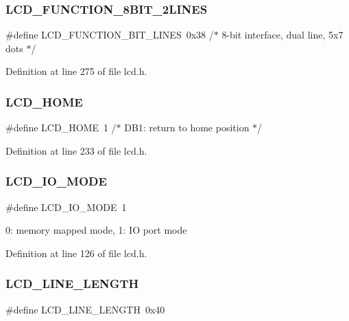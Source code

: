 \subsubsection{\texorpdfstring{LCD\_FUNCTION\_8BIT\_2LINES}{LCD\_FUNCTION\_8BIT\_2LINES}}
{\footnotesize\ttfamily \#define L\+C\+D\+\_\+\+F\+U\+N\+C\+T\+I\+O\+N\+\_\+B\+I\+T\+\_\+L\+I\+N\+ES~0x38   /$\ast$ 8-\/bit interface, dual line,   5x7 dots $\ast$/}



Definition at line 275 of file lcd.\+h.

\mbox{\label{group__pfleury__lcd_gae0e309ccad89222eb3457f2da9f2bb8d}} 
\subsubsection{\texorpdfstring{LCD\_HOME}{LCD\_HOME}}
{\footnotesize\ttfamily \#define L\+C\+D\+\_\+\+H\+O\+ME~1      /$\ast$ D\+B1\+: return to home position        $\ast$/}



Definition at line 233 of file lcd.\+h.

\mbox{\label{group__pfleury__lcd_ga659fcdf979f69bbd14f852f525f25e02}} 
\subsubsection{\texorpdfstring{LCD\_IO\_MODE}{LCD\_IO\_MODE}}
{\footnotesize\ttfamily \#define L\+C\+D\+\_\+\+I\+O\+\_\+\+M\+O\+DE~1}

0\+: memory mapped mode, 1\+: IO port mode 

Definition at line 126 of file lcd.\+h.

\mbox{\label{group__pfleury__lcd_gae59a728d9dee9f12c817b29d38746ed9}} 
\subsubsection{\texorpdfstring{LCD\_LINE\_LENGTH}{LCD\_LINE\_LENGTH}}
{\footnotesize\ttfamily \#define L\+C\+D\+\_\+\+L\+I\+N\+E\+\_\+\+L\+E\+N\+G\+TH~0x40}

